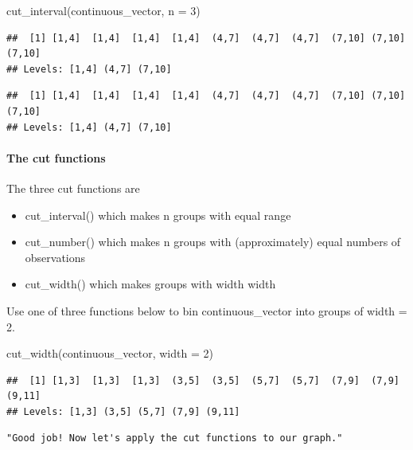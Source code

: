\documentclass[
]{article}
\newenvironment{Shaded}{\begin{snugshade}}{\end{snugshade}}
\newcommand{\AttributeTok}[1]{\textcolor[rgb]{0.77,0.63,0.00}{#1}}
\newcommand{\DecValTok}[1]{\textcolor[rgb]{0.00,0.00,0.81}{#1}}
\newcommand{\FunctionTok}[1]{\textcolor[rgb]{0.00,0.00,0.00}{#1}}
\newcommand{\NormalTok}[1]{#1}
\providecommand{\tightlist}{%
  \setlength{\itemsep}{0pt}\setlength{\parskip}{0pt}}
\begin{document}
\begin{Shaded}
\begin{Highlighting}[]
\FunctionTok{cut\_interval}\NormalTok{(continuous\_vector, }\AttributeTok{n =} \DecValTok{3}\NormalTok{)}
\end{Highlighting}
\end{Shaded}

\begin{verbatim}
##  [1] [1,4]  [1,4]  [1,4]  [1,4]  (4,7]  (4,7]  (4,7]  (7,10] (7,10] (7,10]
## Levels: [1,4] (4,7] (7,10]
\end{verbatim}

\begin{verbatim}
##  [1] [1,4]  [1,4]  [1,4]  [1,4]  (4,7]  (4,7]  (4,7]  (7,10] (7,10] (7,10]
## Levels: [1,4] (4,7] (7,10]
\end{verbatim}

\hypertarget{the-cut-functions}{%
\paragraph{The cut functions}\label{the-cut-functions}}

The three cut functions are

\begin{itemize}
\tightlist
\item
  cut\_interval() which makes n groups with equal range
\item
  cut\_number() which makes n groups with (approximately) equal numbers
  of observations
\item
  cut\_width() which makes groups with width width
\end{itemize}

Use one of three functions below to bin continuous\_vector into groups
of width = 2.

\begin{Shaded}
\begin{Highlighting}[]
\FunctionTok{cut\_width}\NormalTok{(continuous\_vector, }\AttributeTok{width =} \DecValTok{2}\NormalTok{)}
\end{Highlighting}
\end{Shaded}

\begin{verbatim}
##  [1] [1,3]  [1,3]  [1,3]  (3,5]  (3,5]  (5,7]  (5,7]  (7,9]  (7,9]  (9,11]
## Levels: [1,3] (3,5] (5,7] (7,9] (9,11]
\end{verbatim}

\begin{verbatim}
"Good job! Now let's apply the cut functions to our graph."
\end{verbatim}
\end{document}
